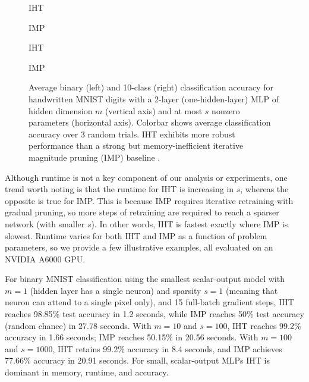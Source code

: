\documentclass{article} %
\newcommand{\m}{\ensuremath{m}}
\newcommand{\1}{\ensuremath{{\sf (i)}}}
\newcommand{\2}{\ensuremath{{\sf (ii)}}}
\newcommand{\3}{\ensuremath{{\sf (iii)}}}
\newcommand{\4}{\ensuremath{{\sf (iv)}}}
\newcommand{\5}{\ensuremath{{\sf (v)}}}
\newcommand{\6}{\ensuremath{{\sf (vi)}}}
\begin{document}
\begin{figure}[ht]
    \centering
    \begin{minipage}{0.24\textwidth}
    \centering
    IHT
    \end{minipage}
    \begin{minipage}{0.24\textwidth}
    \centering
        IMP
    \end{minipage}
    \centering
    \begin{minipage}{0.24\textwidth}
    \centering
    IHT
    \end{minipage}
    \begin{minipage}{0.24\textwidth}
    \centering
        IMP
    \end{minipage}
    \caption{Average binary (left) and 10-class (right) classification accuracy for handwritten MNIST digits with a 2-layer (one-hidden-layer) MLP of hidden dimension $m$ (vertical axis) and at most $s$ nonzero parameters (horizontal axis). Colorbar shows average classification accuracy over 3 random trials. IHT exhibits more robust performance than a strong but memory-inefficient iterative magnitude pruning (IMP) baseline \citep{frankle2018lottery}.}
    \label{fig:mnist}
\end{figure}

Although runtime is not a key component of our analysis or experiments, one trend worth noting is that the runtime for IHT is increasing in $s$, whereas the opposite is true for IMP. This is because IMP requires iterative retraining with gradual pruning, so more steps of retraining are required to reach a sparser network (with smaller $s$). In other words, IHT is fastest exactly where IMP is slowest. Runtime varies for both IHT and IMP as a function of problem parameters, so we provide a few illustrative examples, all evaluated on an NVIDIA A6000 GPU. 

For binary MNIST classification using the smallest scalar-output model with $\m=1$ (hidden layer has a single neuron) and sparsity $s=1$ (meaning that neuron can attend to a single pixel only), and 15 full-batch gradient steps, IHT reaches 98.85\% test accuracy in 1.2 seconds, while IMP reaches 50\% test accuracy (random chance) in 27.78 seconds. With $\m=10$ and $s=100$, IHT reaches 99.2\% accuracy in 1.66 seconds; IMP reaches 50.15\% in 20.56 seconds. With $\m=100$ and $s=1000$, IHT retains 99.2\% accuracy in 8.4 seconds, and IMP achieves 77.66\% accuracy in 20.91 seconds. For small, scalar-output MLPs IHT is dominant in memory, runtime, and accuracy. 
\end{document}
